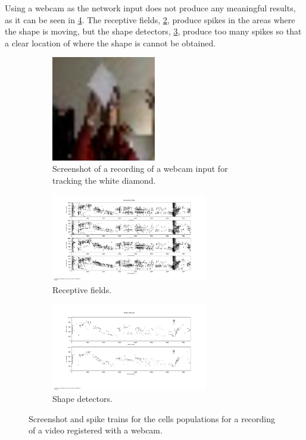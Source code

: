 Using a webcam as the network input does not produce any meaningful results, as it can be seen in \cref{fig:webcam_results}. The receptive fields, \cref{fig:receptive_fields_webcam_input}, produce spikes in the areas where the shape is moving, but the shape detectors, \cref{fig:shape_webcam_input}, produce too many spikes so that a clear location of where the shape is cannot be obtained. 

\begin{figure}[ht]
\centering
\begin{subfigure}{0.45\textwidth}
\centering
\includegraphics[width=0.5\textwidth]{images/evaluation/webcam_input.png} 
\caption{Screenshot of a recording of a webcam input for tracking the white diamond.}
\label{fig:webcam_input}
\end{subfigure}

\begin{subfigure}{\textwidth}
\centering
\includegraphics[width=0.75\textwidth]{images/evaluation/receptive_fields_webcam_input.png}
\caption{Receptive fields.}
\label{fig:receptive_fields_webcam_input}
\end{subfigure}

\begin{subfigure}{\textwidth}
\centering
\includegraphics[width=0.75\textwidth]{images/evaluation/shape_webcam_input.png}
\caption{Shape detectors.}
\label{fig:shape_webcam_input}
\end{subfigure}

\caption[Webcam Input Results]{Screenshot and spike trains for the cells populations for a recording of a video registered with a webcam.}
\label{fig:webcam_results}
\end{figure}
